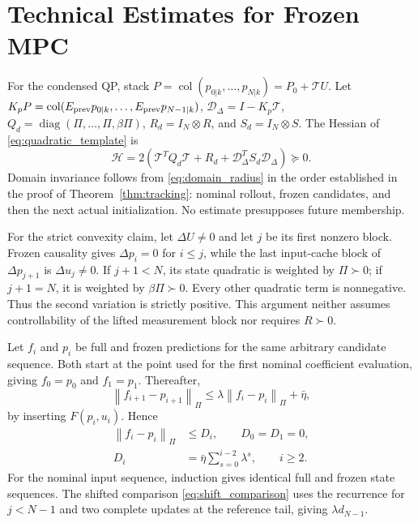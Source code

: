 \documentclass[journal]{IEEEtran}
\theoremstyle{plain}
\theoremstyle{definition}
\newcommand{\norm}[1]{\left\lVert #1\right\rVert}
\newcommand{\col}{\operatorname{col}}
\begin{document}
\section{Technical Estimates for Frozen MPC}
\label{app:estimates}
For the condensed QP, stack $P=\col(p_{0|k},\ldots,p_{N|k})=P_0+\mathcal T U$. Let $K_pP=\col(E_{\rm prev}p_{0|k},\ldots,E_{\rm prev}p_{N-1|k})$, $\mathcal D_\Delta=I-K_p\mathcal T$, $Q_d=\operatorname{diag}(\Pi,\ldots,\Pi,\beta\Pi)$, $R_d=I_N\otimes R$, and $S_d=I_N\otimes S$. The Hessian of \eqref{eq:quadratic_template} is
\begin{equation}
\mathcal H=2(\mathcal T^TQ_d\mathcal T+R_d+
\mathcal D_\Delta^TS_d\mathcal D_\Delta)\succeq0.
\label{eq:QP_Hessian}
\end{equation}
Domain invariance follows from \eqref{eq:domain_radius} in the order established in the proof of Theorem~\ref{thm:tracking}: nominal rollout, frozen candidates, and then the next actual initialization. No estimate presupposes future membership.

For the strict convexity claim, let $\Delta U\ne0$ and let $j$ be its first nonzero block. Frozen causality gives $\Delta p_i=0$ for $i\le j$, while the last input-cache block of $\Delta p_{j+1}$ is $\Delta u_j\ne0$. If $j+1<N$, its state quadratic is weighted by $\Pi\succ0$; if $j+1=N$, it is weighted by $\beta\Pi\succ0$. Every other quadratic term is nonnegative. Thus the second variation is strictly positive. This argument neither assumes controllability of the lifted measurement block nor requires $R\succ0$.

Let $f_i$ and $p_i$ be full and frozen predictions for the same arbitrary candidate sequence. Both start at the point used for the first nominal coefficient evaluation, giving $f_0=p_0$ and $f_1=p_1$. Thereafter,
\begin{equation*}
\norm{f_{i+1}-p_{i+1}}_\Pi\le
\lambda\norm{f_i-p_i}_\Pi+\bar\eta,
\end{equation*}
by inserting $F(p_i,u_i)$. Hence
\begin{equation}
\begin{split}
\norm{f_i-p_i}_\Pi&\le D_i,\qquad D_0=D_1=0,\\
D_i&=\bar\eta\sum_{s=0}^{i-2}\lambda^s,\qquad i\ge2.
\end{split}
\label{eq:frozen_discrepancy}
\end{equation}
For the nominal input sequence, induction gives identical full and frozen state sequences. The shifted comparison \eqref{eq:shift_comparison} uses the recurrence for $j<N-1$ and two complete updates at the reference tail, giving $\lambda d_{N-1}$.
\end{document}
